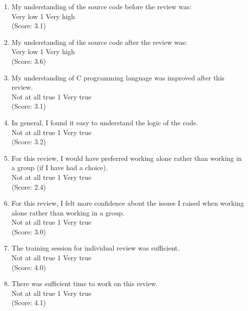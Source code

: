 \begin{enumerate}

\item  My understanding of the source code before the review was: 
\\
Very low \hfill 1     \hfill Very high\\
(Score: 3.1)

\item  My understanding of the source code after the review was: 
\\
Very low \hfill 1     \hfill
Very high\\
(Score: 3.6)

\item  My understanding of C programming language was improved after
this review.  
\\
Not at all true \hfill 1     \hfill Very true\\
(Score: 3.1)

\item  In general, I found it easy to understand the logic of
the code. 
\\
Not at all true \hfill 1     \hfill Very true\\
(Score: 3.2)

\item  For this review, I would have preferred working alone rather 
than working in a group (if I have had a choice).
\\
Not at all true \hfill 1     \hfill Very true\\
(Score: 2.4)

\item  For this review, I felt more confidence about the issues I raised when 
working alone rather than working in a group.
\\
Not at all true \hfill 1     \hfill Very true\\
(Score: 3.0)

\item  The training session for individual review was sufficient.
\\
Not at all true \hfill 1     \hfill Very true\\
(Score: 4.0)

\item   There was sufficient time to work on this review.
\\
Not at all true \hfill 1     \hfill Very true\\
(Score: 4.1)


\end{enumerate}
